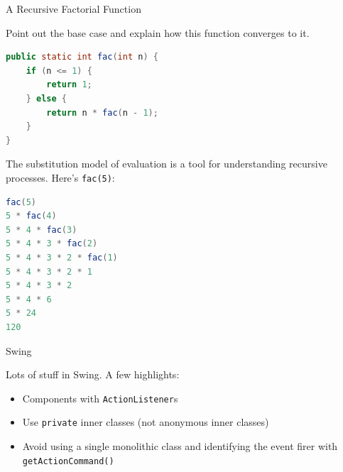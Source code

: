 \documentclass{beamer}
\begin{document}
\begin{frame}[fragile]{A Recursive Factorial Function}


Point out the base case and explain how this function converges to it.
\vspace{-.05in}
\begin{lstlisting}[language=Java]
public static int fac(int n) {
    if (n <= 1) {
        return 1;
    } else {
        return n * fac(n - 1);
    }
}
\end{lstlisting}
\vspace{-.05in}
The substitution model of evaluation is a tool for understanding recursive processes.  Here's {\tt fac(5)}:
\vspace{-.05in}
\begin{lstlisting}[language=Java]
fac(5)
5 * fac(4)
5 * 4 * fac(3)
5 * 4 * 3 * fac(2)
5 * 4 * 3 * 2 * fac(1)
5 * 4 * 3 * 2 * 1
5 * 4 * 3 * 2
5 * 4 * 6
5 * 24
120
\end{lstlisting}


\end{frame}


\begin{frame}[fragile]{Swing}


Lots of stuff in Swing.  A few highlights:
\begin{itemize}
\item Components with {\tt ActionListener}s
\item Use {\tt private} inner classes (not anonymous inner classes)
\item Avoid using a single monolithic class and identifying the event firer with {\tt getActionCommand()}
\end{itemize}


\end{frame}
\end{document}
